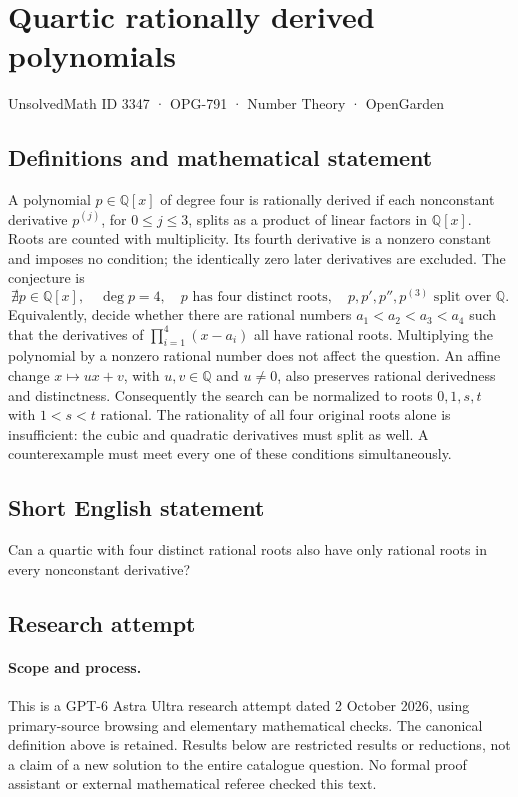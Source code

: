 \documentclass[11pt,a4paper]{article}
\begin{document}
\section*{Quartic rationally derived polynomials}\label{3347}
{\small UnsolvedMath ID 3347 · OPG-791 · Number Theory · OpenGarden}
\subsection{Definitions and mathematical statement}
A polynomial $p\in\mathbb Q[x]$ of degree four is rationally derived if
each nonconstant derivative $p^{(j)}$, for $0\le j\le3$, splits as a
product of linear factors in $\mathbb Q[x]$. Roots are counted with
multiplicity. Its fourth derivative is a nonzero constant and imposes
no condition; the identically zero later derivatives are excluded.
The conjecture is
\[
 \nexists p\in\mathbb Q[x],\quad \deg p=4,
 \quad p\text{ has four distinct roots},
 \quad p,p',p'',p^{(3)}\text{ split over }\mathbb Q.
\]
Equivalently, decide whether there are rational numbers
$a_1<a_2<a_3<a_4$ such that the derivatives of
$\prod_{i=1}^4(x-a_i)$ all have rational roots. Multiplying the
polynomial by a nonzero rational number does not affect the question.
An affine change $x\mapsto ux+v$, with $u,v\in\mathbb Q$ and $u\ne0$,
also preserves rational derivedness and distinctness. Consequently the
search can be normalized to roots $0,1,s,t$ with $1<s<t$ rational.
The rationality of all four original roots alone is insufficient:
the cubic and quadratic derivatives must split as well. A counterexample
must meet every one of these conditions simultaneously.
\subsection{Short English statement}
Can a quartic with four distinct rational roots also have only rational roots in every nonconstant derivative?
\subsection{Research attempt}
\paragraph{Scope and process.}
This is a GPT-6 Astra Ultra research attempt dated 2 October 2026, using
primary-source browsing and elementary mathematical checks. The canonical
definition above is retained. Results below are restricted results or
reductions, not a claim of a new solution to the entire catalogue question.
No formal proof assistant or external mathematical referee checked this text.
\end{document}
